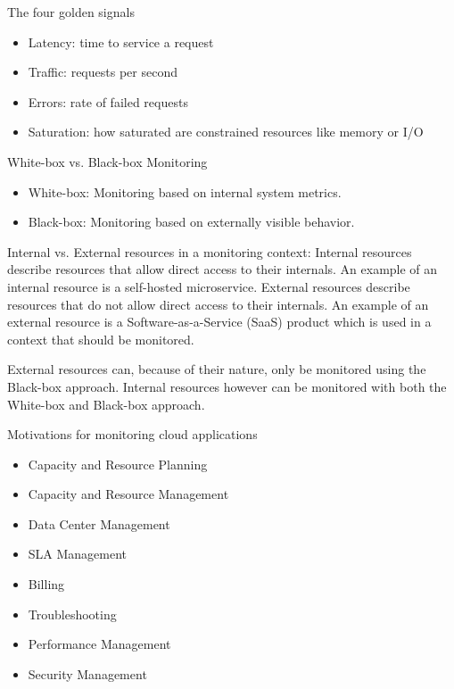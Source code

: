 The four golden signals \cite{Beyer2016-xi}
\begin{itemize}
    \item Latency: time to service a request
    \item Traffic: requests per second
    \item Errors: rate of failed requests
    \item Saturation: how saturated are constrained resources like memory or I/O
\end{itemize}

White-box vs. Black-box Monitoring \cite{Beyer2016-xi}
\begin{itemize}
    \item White-box: Monitoring based on internal system metrics.
    \item Black-box: Monitoring based on externally visible behavior.
\end{itemize}

Internal vs. External resources in a monitoring context:
Internal resources describe resources that allow direct access to their internals.
An example of an internal resource is a self-hosted microservice.
External resources describe resources that do not allow direct access to their internals.
An example of an external resource is a Software-as-a-Service (SaaS) product which is used in a context that should be monitored.

External resources can, because of their nature, only be monitored using the Black-box approach.
Internal resources however can be monitored with both the White-box and Black-box approach.

Motivations for monitoring cloud applications \cite{6483656}
\begin{itemize}
    \item Capacity and Resource Planning
    \item Capacity and Resource Management
    \item Data Center Management
    \item SLA Management
    \item Billing
    \item Troubleshooting
    \item Performance Management
    \item Security Management
\end{itemize}



